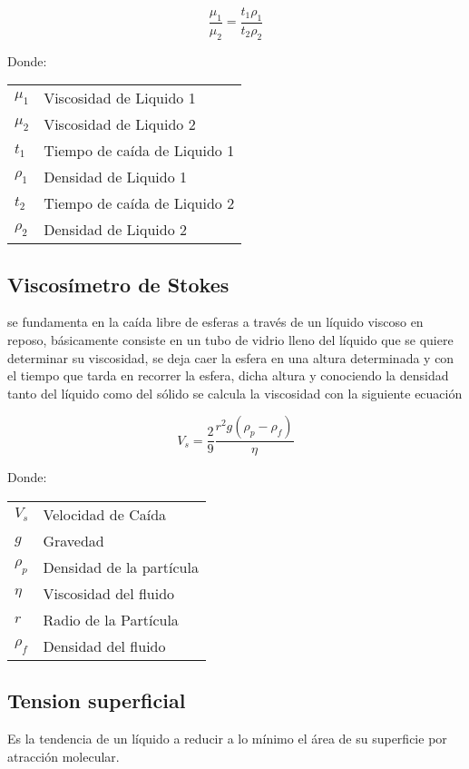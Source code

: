 \documentclass[11pt, letterpaper]{article}
\makeatletter
\newenvironment{conditions}
  {\par\vspace{\abovedisplayskip}\noindent\begin{tabular}{>{$}l<{$} @{${}={}$} l}}
  {\end{tabular}\par\vspace{\belowdisplayskip}}
\makeatother
\begin{document}
\begin{equation}
\frac{\mu _{1}}{\mu_{2}} = \frac{t_{1} \rho_{1} }{t_{2} \rho_{2}}
\end{equation}

Donde:
\begin{conditions}
 \mu _{1} &  Viscosidad de Liquido 1 \\
 \mu _{2} &  Viscosidad de Liquido 2 \\   
 t_{1} &  Tiempo de caída de Liquido 1 \\
 \rho_{1} &  Densidad de Liquido 1 \\
 t_{2} &  Tiempo de caída de Liquido 2 \\
 \rho_{2} &  Densidad de Liquido 2
\end{conditions}

\subsection{Viscosímetro de Stokes}
se fundamenta en la caída libre de esferas a través de un líquido  viscoso en reposo, básicamente consiste en un tubo de vidrio lleno  del líquido que se quiere determinar su viscosidad, se deja caer la esfera en una altura determinada y con el tiempo que tarda en  recorrer la esfera, dicha altura y conociendo la densidad tanto del líquido como del sólido se calcula la viscosidad con la siguiente ecuación

\begin{equation}
V_{s} = \frac{2}{9} \frac{r^{2} g (\rho_{p} -\rho_{f})}{\eta}
\end{equation}

Donde:
\begin{conditions}
 V_{s} &  Velocidad de Caída \\
 g &  Gravedad \\   
 \rho_{p} &  Densidad de la partícula \\
 \eta &  Viscosidad del fluido \\
 r &  Radio de la Partícula \\
 \rho_{f} &  Densidad del fluido
\end{conditions}

\subsection{Tension superficial}
Es la tendencia de un líquido a reducir a lo mínimo el área de su superficie por atracción molecular.\\
\end{document}
